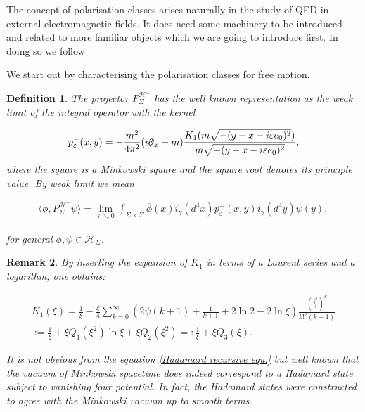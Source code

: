 \documentclass[b5paper,draft,openbib,12pt]{memoir}
\newtheorem{Def}{Definition}
\newtheorem{Remark}[Def]{Remark}
\begin{document}
The concept of polarisation classes arises naturally in the study of QED in external electromagnetic fields. It does need some
machinery to be introduced and related to more familiar objects which we are going to introduce first. In doing so we follow \cite{ivp2}



We start out by characterising the polarisation classes for free motion.
\begin{Def}
The projector \(P^{\mathcal{H}^-}_{\Sigma} \) has the well known representation 
as the weak limit of the integral operator 
with the kernel\cite{ivp2}

\begin{equation}
p^-_\varepsilon(x,y)= -\frac{m^2}{4\pi^2}(i\slashed{\partial}_x+m) \frac{K_1(m \sqrt{-(y-x-i \varepsilon e_0)^2})}{m \sqrt{-(y-x-i \varepsilon e_0)^2}},
\end{equation}
where the square is a Minkowski square and the square root denotes its principle value. By weak limit we mean

\begin{align}
\langle \phi, P^{\mathcal{H}^-}_{\Sigma} \psi\rangle = \lim_{\varepsilon \searrow 0} \int_{\Sigma\times \Sigma} \overline{\phi}(x) i_\gamma(d^4x) p^-_\varepsilon(x,y ) i_\gamma(d^4y) \psi(y),
\end{align}

for general \(\phi, \psi \in \mathcal{H}_\Sigma\).
\end{Def}

\begin{Remark}
By inserting the expansion of \(K_1\) in terms of a Laurent series and a logarithm, \cite{abramowitz1965handbook} one obtains:

\begin{align}\label{K1series}
K_1(\xi) = \frac{1}{\xi}- \frac{\xi}{4} \sum_{k=0}^\infty \left(2 \psi(k+1)+\frac{1}{k+1}+2\ln 2 -2 \ln \xi \right) \frac{\left(\frac{\xi^2}{4}\right)^k}{k!^2 (k+1)}\\\label{def:Q}
:=\frac{1}{\xi} + \xi Q_1(\xi^2) \ln \xi +\xi Q_2(\xi^2)=:\frac{1}{\xi} + \xi Q_3(\xi).
\end{align}

It is not obvious from the equation \eqref{Hadamard recursive equ.} but well known that the
  vacuum of Minkowski spacetime does indeed
correspond to  a Hadamard state subject to vanishing four potential. In fact, the Hadamard states were constructed to 
agree with the Minkowski vacuum up to smooth terms.
\end{Remark}
\end{document}
